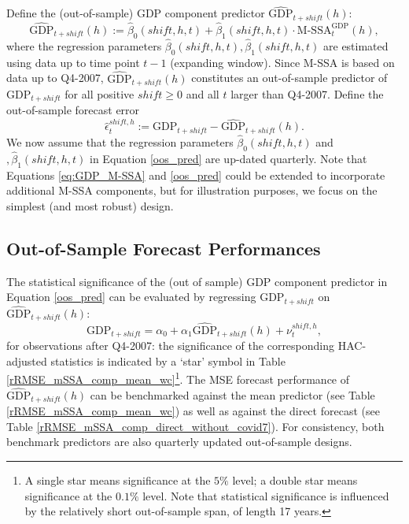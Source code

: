 \documentclass[11pt,a4paper]{article}
\begin{document}
Define the (out-of-sample) GDP component predictor $\hat{\textrm{GDP}}_{t+shift}(h)$:  
\begin{equation}\label{oos_pred}
\hat{\textrm{GDP}}_{t+shift}(h):=\hat{\beta}_0(shift,h,t)+\hat{\beta}_1(shift,h,t) \cdot \textrm{M-SSA}^{\textrm{GDP}}_t(h),
\end{equation}
where the regression parameters $\hat{\beta}_0(shift,h,t),\hat{\beta}_1(shift,h,t)$ are estimated using data up to time point $t-1$ (expanding window). Since M-SSA is based on data up to Q4-2007, $\hat{\textrm{GDP}}_{t+shift}(h)$ constitutes an out-of-sample predictor of $\textrm{GDP}_{t+shift}$ for all positive $shift\geq 0$ and all $t$ larger than Q4-2007. Define the out-of-sample forecast error
\begin{equation}\label{oosfe}
\hat{\epsilon}_t^{shift,h}:={\textrm{GDP}}_{t+shift}-\hat{\textrm{GDP}}_{t+shift}(h).
\end{equation}
We now assume that the regression parameters $\hat{\beta}_0(shift,h,t)$ and$,\hat{\beta}_1(shift,h,t)$ in Equation \ref{oos_pred} are up-dated quarterly. Note that Equations \ref{eq:GDP_M-SSA} and \ref{oos_pred} could be extended to incorporate additional M-SSA components, but for illustration purposes, we focus on the simplest (and most robust) design.


\subsection{Out-of-Sample Forecast Performances}\label{oosp}

The statistical significance of the (out of sample) GDP component predictor in Equation \ref{oos_pred}  can be evaluated by regressing 
$\textrm{GDP}_{t+shift}$ on $\hat{\textrm{GDP}}_{t+shift}(h)$:
\begin{equation}\label{eq_gdp_pred}
\textrm{GDP}_{t+shift}=\alpha_0+\alpha_1\hat{\textrm{GDP}}_{t+shift}(h)+\nu_{t}^{shift,h},
\end{equation}
for observations after Q4-2007: the significance of the corresponding HAC-adjusted statistics is indicated by a `star' symbol in Table \ref{rRMSE_mSSA_comp_mean_wc}\footnote{A single star means significance at the $5\%$ level; a double star means significance at the $0.1\%$ level. Note that statistical significance is influenced by the relatively short out-of-sample span, of length 17 years.}. The MSE forecast performance of $\hat{\textrm{GDP}}_{t+shift}(h)$ can be benchmarked against the mean predictor (see Table \ref{rRMSE_mSSA_comp_mean_wc}) as well as against the direct forecast (see Table \ref{rRMSE_mSSA_comp_direct_without_covid7}). For consistency, both benchmark predictors are also quarterly updated out-of-sample designs.\\
\end{document}
